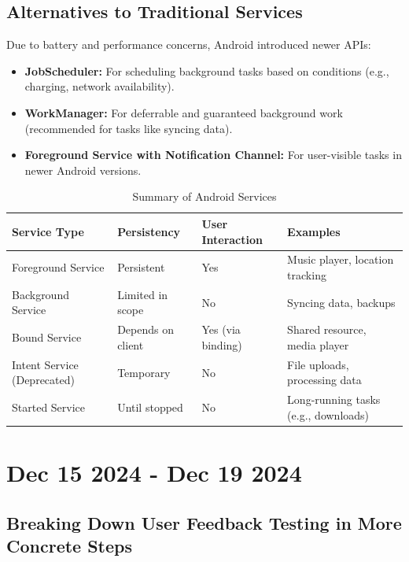 \documentclass[12pt]{article}
\begin{document}
\begin{itemize}
    \subsection{Alternatives to Traditional Services}
    Due to battery and performance concerns, Android introduced newer APIs:
    \begin{itemize}
        \item \textbf{JobScheduler:} For scheduling background tasks based on conditions (e.g., charging, network availability).
        \item \textbf{WorkManager:} For deferrable and guaranteed background work (recommended for tasks like syncing data).
        \item \textbf{Foreground Service with Notification Channel:} For user-visible tasks in newer Android versions.
    \end{itemize}
    
    
    \begin{table}[h!]
    \centering
    \begin{tabular}{|l|l|l|l|}
    \hline
    \textbf{Service Type}     & \textbf{Persistency} & \textbf{User Interaction} & \textbf{Examples}                  \\ \hline
    Foreground Service        & Persistent           & Yes                       & Music player, location tracking    \\ \hline
    Background Service        & Limited in scope     & No                        & Syncing data, backups              \\ \hline
    Bound Service             & Depends on client    & Yes (via binding)         & Shared resource, media player      \\ \hline
    Intent Service (Deprecated) & Temporary          & No                        & File uploads, processing data      \\ \hline
    Started Service           & Until stopped        & No                        & Long-running tasks (e.g., downloads) \\ \hline
    \end{tabular}
    \caption{Summary of Android Services}
    \end{table}
    
    \section{ Dec 15 2024 - Dec 19 2024 }
    \subsection{Breaking Down User Feedback Testing in More Concrete Steps}

\end{itemize}
\end{document}
